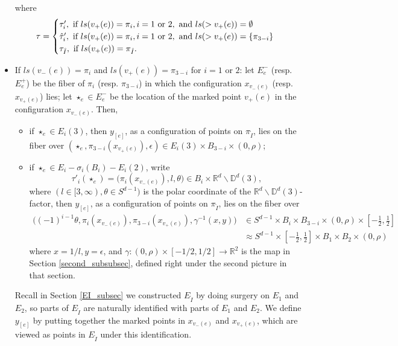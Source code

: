 \documentclass[11pt]{article}
\theoremstyle{definition}
\theoremstyle{remark}
\def\R{\mathbb{R}}
\def\D{\mathbb{D}}
\def\rI{{\mathring{I}}}
\def\tn#1{\textnormal{#1}}
\begin{document}
\begin{itemize}
\begin{align*}
\end{align*}
where 
$$\tau=\begin{cases}
\tau'_i, \tn{ if }ls(v_+(e))=\pi_i, i=1 \tn{ or } 2, \tn{ and } ls(>v_+(e))=\emptyset \\
\hat\tau'_i, \tn{ if }ls(v_+(e))=\pi_i, i=1 \tn{ or } 2, \tn{ and } ls(>v_+(e))=\{\pi_{3-i}\} \\
\tau_\rI, \tn{ if }ls(v_+(e))=\pi_\rI. 
\end{cases}$$
\item  If $ls(v_-(e))=\pi_{i}$ and $ls(v_+(e))=\pi_{3-i}$ for  $i=1$ or $2$:  
let $E^-_e$ (resp. $E^+_e$) be the fiber of $\pi_{i}$ (resp. $\pi_{3-i}$) in which the configuration $x_{v_-(e)}$ (resp. $x_{v_+(e)}$) lies; 
let $\star_e\in E_e^-$ be the location of the marked point $v_+(e)$ in the configuration $x_{v_-(e)}$. 
Then, 
\begin{itemize}
\item if $\star_e\in E_{i}(3)$, 
then $y_{[e]}$, as a configuration of points on $\pi_\rI$, lies on the fiber over
$(\star_e,\pi_{3-i}(x_{v_+(e)}),\epsilon)\in E_i(3)\times B_{3-i}\times(0,\rho)$; 
\item if $\star_e\in E_{i}-\sigma_{i}(B_i)-E_{i}(2)$,  
write 
$$\tau'_i(\star_e)=\big(\pi_i(x_{v_-(e)}),l,\theta\big)\in B_i\times \R^d\backslash\D^d(3),$$
where $(l\in[3,\infty), \theta\in S^{d-1})$ is the polar coordinate of the $\R^d\backslash\D^d(3)$-factor,
then $y_{[e]}$, as a configuration of points on $\pi_\rI$, lies on the fiber over
\begin{align*}
\big((-1)^{i-1}\theta,\pi_i(x_{v_-(e)}),\pi_{3-i}(x_{v_+(e)}),\gamma^{-1}(x,y)\big)&\in S^{d-1}\times B_i\times B_{3-i}\times(0,\rho)\times[-\frac{1}{2},\frac{1}{2}]\\
&%
{\approx} S^{d-1}\times[-\frac{1}{2},\frac{1}{2}]\times B_1\times B_{2}\times(0,\rho)
\end{align*}
where $x=1/l, y=\epsilon$, and
$\gamma:(0,\rho)\times[-1/2,1/2]\to\R^2$ is the map in Section \ref{second_subsubsec}, defined right under the second picture in that section. 
\end{itemize}
Recall in Section \ref{EI_subsec} we constructed $E_\rI$ by doing surgery on $E_1$ and $E_2$, so parts of $E_\rI$ are naturally identified with parts of $E_1$ and $E_2$.
We define $y_{[e]}$ by putting together the marked points in $x_{v_-(e)}$ and $x_{v_+(e)}$, which are viewed as points in $E_\rI$ under this identification. 
\end{itemize}
\end{document}
